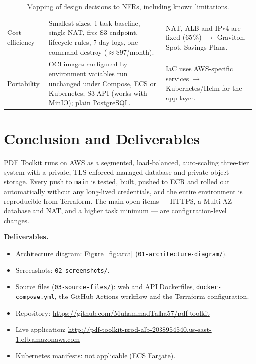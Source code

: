 \documentclass[11pt,a4paper]{article}
\newcommand{\repourl}{https://github.com/MuhammadTalha57/pdf-toolkit}
\newcommand{\appurl}{http://pdf-toolkit-prod-alb-2038954540.us-east-1.elb.amazonaws.com}
\begin{document}
\begin{table}[H]
\begin{tabularx}{\textwidth}{L{2.05cm}L{8.1cm}X}
Cost-efficiency & Smallest sizes, 1-task baseline, single NAT, free S3 endpoint, lifecycle rules, 7-day logs, one-command destroy ($\approx$\$97/month). & NAT, ALB and IPv4 are fixed (65\,\%) $\rightarrow$ Graviton, Spot, Savings Plans.\\
Portability & OCI images configured by environment variables run unchanged under Compose, ECS or Kubernetes; S3 API (works with MinIO); plain PostgreSQL. & IaC uses AWS-specific services $\rightarrow$ Kubernetes/Helm for the app layer.\\
\bottomrule
\end{tabularx}
\caption{Mapping of design decisions to NFRs, including known limitations.}
\end{table}

\section{Conclusion and Deliverables}
PDF Toolkit runs on AWS as a segmented, load-balanced, auto-scaling three-tier
system with a private, TLS-enforced managed database and private object
storage. Every push to \texttt{main} is tested, built, pushed to ECR and rolled
out automatically without any long-lived credentials, and the entire
environment is reproducible from Terraform. The main open items --- HTTPS, a
Multi-AZ database and NAT, and a higher task minimum --- are configuration-level
changes.

\textbf{Deliverables.}
\begin{itemize}
  \item Architecture diagram: Figure~\ref{fig:arch} (\texttt{01-architecture-diagram/}).
  \item Screenshots: \texttt{02-screenshots/}.
  \item Source files (\texttt{03-source-files/}): web and API Dockerfiles,
        \texttt{docker-compose.yml}, the GitHub Actions workflow and the
        Terraform configuration.
  \item Repository: \url{\repourl}
  \item Live application: {\small\url{\appurl}}
  \item Kubernetes manifests: not applicable (ECS Fargate).
\end{itemize}
\end{document}
